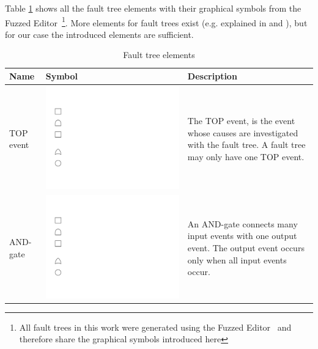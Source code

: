 Table \ref{tab:faulttreeelements} shows all the fault tree elements with their graphical symbols from the Fuzzed Editor~\cite{fuzzed}\footnote{All fault trees in this work were generated using the Fuzzed Editor~\cite{fuzzed} and therefore share the graphical symbols introduced here}. More elements for fault trees exist (e.g. explained in \cite{NuclearFT} and \cite{NasaFT}), but for our case the introduced elements are sufficient.

\begin{table}[!h]
  \centering
  \caption{Fault tree elements}
  \label{tab:faulttreeelements}
  \small
  \begin{tabularx}{\linewidth}{ |l|m{1.35cm}|X| }
    \hline
    Name & Symbol & Description \\
    \hline
    TOP event & \includegraphics[keepaspectratio=true,scale=0.8] {images/fault-tree-top-event.pdf} & The TOP event, is the event whose causes are investigated with the fault tree. A fault tree may only have one TOP event. \\
    \hline
    AND-gate & \includegraphics[keepaspectratio=true,scale=0.8] {images/fault-tree-and-gate.pdf} & An AND-gate connects many input events with one output event. The output event occurs only when all input events occur. \\

\end{tabularx}
\end{table}
